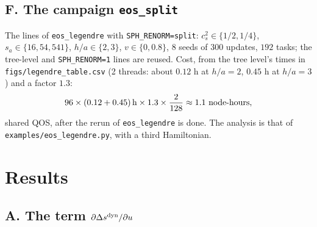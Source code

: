 \documentclass[11pt,aps,preprint,nofootinbib,superscriptaddress,tightenlines]{revtex4-2}
\def\st{\begin{equation}}
\def\stp{\end{equation}}
\begin{document}
\subsection{F. The campaign \texttt{eos\_split}}

The lines of \texttt{eos\_legendre} with \texttt{SPH\_RENORM=split}: $c_s^2\in\{1/2,1/4\}$, $s_a\in\{16,54,541\}$, $h/a\in\{2,3\}$, $v\in\{0,0.8\}$, 8 seeds of 300
updates, $192$ tasks; the tree-level and \texttt{SPH\_RENORM=1} lines are reused.  Cost, from the tree level's times in \nolinkurl{figs/legendre_table.csv} (2 threads:
about $0.12$ h at $h/a=2$, $0.45$ h at $h/a=3$) and a factor $1.3$:
\st
96\times(0.12+0.45)\,{\rm h}\times1.3\times\frac{2}{128}\approx1.1\ \text{node-hours},
\stp
shared QOS, after the rerun of \texttt{eos\_legendre} is done.  The analysis is that of \nolinkurl{examples/eos_legendre.py}, with a third Hamiltonian.

\section{Results}
\label{sec:results}

\subsection{A. The term \texorpdfstring{$\partial\Delta s^{\rm dyn}/\partial u$}{dDs/du}}
\end{document}
